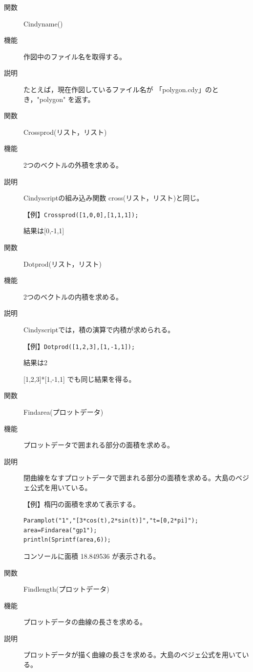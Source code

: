 \documentclass[papersize,a4paper,12pt,uplatex]{jsarticle}
\begin{document}
\begin{description}
\vspace{\baselineskip}
\hypertarget{cindyname}{}
\item[関数]Cindyname()
\item[機能]作図中のファイル名を取得する。
\item[説明]たとえば，現在作図しているファイル名が 「polygon.cdy」のとき，"polygon" を返す。

\vspace{\baselineskip}
\hypertarget{crossprod}{}
\item[関数]Crossprod(リスト，リスト)
\item[機能]2つのベクトルの外積を求める。
\item[説明]Cindyscriptの組み込み関数 cross(リスト，リスト)と同じ。

\vspace{\baselineskip}
【例】\verb|Crossprod([1,0,0],[1,1,1]);|

結果は[0,-1,1]\\

\vspace{\baselineskip}
\hypertarget{dotprod}{}
\item[関数]Dotprod(リスト，リスト)
\item[機能]2つのベクトルの内積を求める。
\item[説明]Cindyscriptでは，積の演算で内積が求められる。

\vspace{\baselineskip}
【例】\verb|Dotprod([1,2,3],[1,-1,1]);|

結果は2

[1,2,3]*[1,-1,1] でも同じ結果を得る。

\vspace{\baselineskip}
\hypertarget{findarea}{}
\item[関数]Findarea(プロットデータ)
\item[機能]プロットデータで囲まれる部分の面積を求める。
\item[説明]閉曲線をなすプロットデータで囲まれる部分の面積を求める。大島のベジェ公式を用いている。

\vspace{\baselineskip}
【例】楕円の面積を求めて表示する。
\begin{verbatim}
Paramplot("1","[3*cos(t),2*sin(t)]","t=[0,2*pi]");
area=Findarea("gp1");
println(Sprintf(area,6));
\end{verbatim}

コンソールに面積 18.849536 が表示される。 

\vspace{\baselineskip}
\hypertarget{findlength}{}
\item[関数]Findlength(プロットデータ)
\item[機能]プロットデータの曲線の長さを求める。
\item[説明]プロットデータが描く曲線の長さを求める。大島のベジェ公式を用いている。


\end{description}
\end{document}
